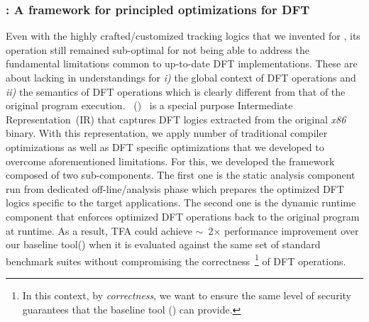\documentclass[letterpaper, 10pt]{article}
\begin{document}
\begin{small}
\subsubsection*{\TFA: A framework for principled optimizations for DFT}

Even with the highly crafted/customized tracking logics that we invented for
\libdft, its operation still remained sub-optimal for not being able to address
the fundamental limitations common to up-to-date DFT implementations. These are
about lacking in understandings for {\it i)} the global context of DFT
operations and {\it ii)} the semantics of DFT operations which is clearly
different from that of the original program execution.
%
\TFAFull~(\TFA)~\cite{tfa:2012ndss} is a special purpose Intermediate
Representation~(IR) that captures DFT logics extracted from the original {\it
x86} binary. With this representation, we apply number of traditional compiler
optimizations as well as DFT specific optimizations that we developed to
overcome aforementioned limitations.
%
For this, we developed the framework composed of two sub-components.
The first one is the static analysis component run from dedicated
off-line/analysis phase which prepares the optimized DFT logics specific to the
target applications. The second one is the dynamic runtime component that
enforces optimized DFT operations back to the original program at runtime.
%
%
As a result, TFA could achieve \(\sim\)~2\(\times\) performance improvement
over  our baseline tool(\libdft) when it is evaluated against the same set of
standard benchmark suites without compromising the correctness~\footnote{In
        this context, by {\it correctness}, we want to ensure the same level of
security guarantees that the baseline tool (\libdft) can provide.} of DFT
operations.


\end{small}
\end{document}
